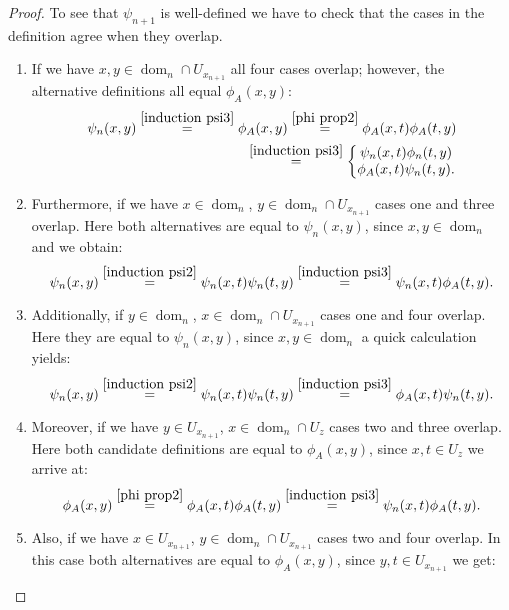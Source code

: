 \documentclass[b5paper,draft,openbib,12pt]{memoir}
\DeclareMathOperator{\dom}{dom}
\begin{document}
\begin{proof}
To see that \(\psi_{n+1}\) is well-defined we have to check 
that the cases in the definition agree when they overlap. 
\begin{enumerate}
  \item If we have \(x,y \in \dom_n\cap U_{x_{n+1}}\) all four cases overlap; however, the 
  alternative definitions all equal \(\phi_A(x,y)\):
\begin{align}\nonumber
  \psi_n(x,y)\overset{\eqref{induction psi3}}{=}\phi_A(x,y)\overset{\eqref{phi prop2}}{=}\phi_A(x,t) \phi_A(t,y)
  \\
\overset{\eqref{induction psi3}}{=}\left\{\begin{matrix}\psi_n(x,t) \phi_n(t,y)\\ \phi_A(x,t) \psi_n(t,y).\end{matrix}\right.
  \end{align}
  \item Furthermore, if we have \(x\in \dom_n\), \(y\in \dom_n\cap U_{x_{n+1}}\) cases one 
  and three overlap. Here both alternatives are equal to
  \(\psi_n(x,y)\), since \(x,y\in \dom_n\) and we obtain:
  \begin{equation}
  \psi_n(x,y)\overset{\eqref{induction psi2}}{=}\psi_n(x,t)\psi_n(t,y)\overset{\eqref{induction psi3}}{=}\psi_n(x,t)\phi_A(t,y).
  \end{equation}
  \item Additionally, if \(y\in \dom_n\), \(x\in \dom_n\cap U_{x_{n+1}}\) cases one and four overlap. 
  Here they are equal to
  \(\psi_n(x,y)\), since \(x,y\in \dom_n\) a quick calculation yields:
  \begin{equation}
  \psi_n(x,y)\overset{\eqref{induction psi2}}{=}\psi_n(x,t)\psi_n(t,y)\overset{\eqref{induction psi3}}{=}\phi_A(x,t)\psi_n(t,y).
  \end{equation}
  \item Moreover, if we have \(y\in U_{x_{n+1}}\), \(x\in \dom_n\cap U_z\) 
  cases two and three overlap. Here both candidate definitions are equal to
  \(\phi_A(x,y)\), since \(x,t\in U_z\) we arrive at:
  \begin{equation}
  \phi_A(x,y)\overset{\eqref{phi prop2}}{=}\phi_A(x,t)\phi_A(t,y)\overset{\eqref{induction psi3}}{=}\psi_n(x,t)\phi_A(t,y).
  \end{equation}
  \item Also, if we have \(x\in U_{x_{n+1}}\), \(y\in \dom_n\cap U_{x_{n+1}}\) 
  cases two and four overlap. In this case both alternatives are equal to
  \(\phi_A(x,y)\), since \(y,t\in U_{x_{n+1}}\) we get:
    \begin{equation}

\end{equation}
\end{enumerate}
\end{proof}
\end{document}
